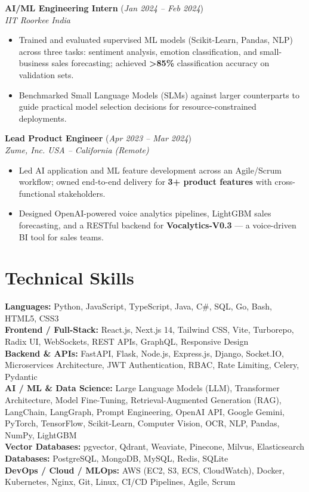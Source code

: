 \documentclass[10pt,letterpaper]{article}
\newcommand{\jobheader}[4]{%
  \textbf{#1} (\textit{#4})\\
  \textit{#2} \textemdash{} \textit{#3}
  \vspace{0.04cm}
}
\begin{document}
\vspace{0.12cm}

\jobheader{AI/ML Engineering Intern}{IIT Roorkee}{India}{Jan 2024 -- Feb 2024}
\begin{itemize}
  \item Trained and evaluated supervised ML models (Scikit-Learn, Pandas, NLP) across three tasks:
  sentiment analysis, emotion classification, and small-business sales forecasting;
  achieved \textbf{>85\%} classification accuracy on validation sets.
  \item Benchmarked Small Language Models (SLMs) against larger counterparts to guide practical
  model selection decisions for resource-constrained deployments.
\end{itemize}

\vspace{0.12cm}

\jobheader{Lead Product Engineer}{Zume, Inc.}{USA -- California (Remote)}{Apr 2023 -- Mar 2024}
\begin{itemize}
  \item Led AI application and ML feature development across an Agile/Scrum workflow;
  owned end-to-end delivery for \textbf{3+ product features} with cross-functional stakeholders.
  \item Designed OpenAI-powered voice analytics pipelines, LightGBM sales forecasting, and a
  RESTful backend for \textbf{Vocalytics-V0.3} --- a voice-driven BI tool for sales teams.
\end{itemize}

\vspace{0.05cm}

\section{Technical Skills}

\noindent
\textbf{Languages:} Python, JavaScript, TypeScript, Java, C\#, SQL, Go, Bash, HTML5, CSS3\\[0.08cm]
\textbf{Frontend / Full-Stack:} React.js, Next.js 14, Tailwind CSS, Vite, Turborepo, Radix UI,
WebSockets, REST APIs, GraphQL, Responsive Design\\[0.08cm]
\textbf{Backend \& APIs:} FastAPI, Flask, Node.js, Express.js, Django, Socket.IO, Microservices
Architecture, JWT Authentication, RBAC, Rate Limiting, Celery, Pydantic\\[0.08cm]
\textbf{AI / ML \& Data Science:} Large Language Models (LLM), Transformer Architecture,
Model Fine-Tuning, Retrieval\mbox{-}Augmented Generation (RAG), LangChain, LangGraph,
Prompt Engineering, OpenAI API, Google Gemini, PyTorch, TensorFlow, Scikit-Learn,
Computer Vision, OCR, NLP, Pandas, NumPy, LightGBM\\[0.08cm]
\textbf{Vector Databases:} pgvector, Qdrant, Weaviate, Pinecone, Milvus, Elasticsearch\\[0.08cm]
\textbf{Databases:} PostgreSQL, MongoDB, MySQL, Redis, SQLite\\[0.08cm]
\textbf{DevOps / Cloud / MLOps:} AWS (EC2, S3, ECS, CloudWatch), Docker, Kubernetes,
Nginx, Git, Linux, CI/CD Pipelines, Agile, Scrum
\end{document}
